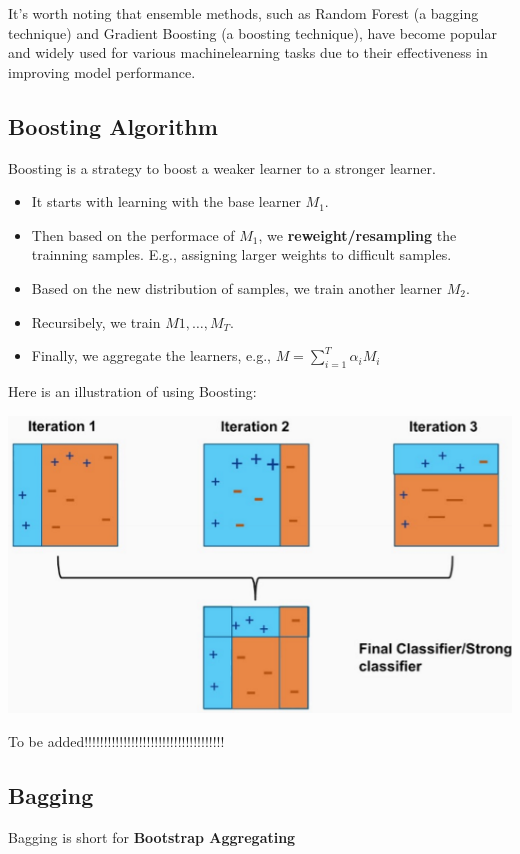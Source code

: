 \documentclass[letterpaper,12pt]{article}
\begin{document}
It's worth noting that ensemble methods, such as Random Forest (a bagging technique) and Gradient Boosting (a boosting technique), have become popular and widely used for various machine\-learning tasks due to their effectiveness in improving model performance.

\subsection{Boosting Algorithm}
Boosting is a strategy to boost a weaker learner to a stronger learner. 
\begin{itemize}
    \item It starts with learning with the base learner $M_1$. 
    \item Then based on the performace of $M_1$, we \textbf{reweight/resampling} the trainning samples. E.g., assigning larger weights to difficult samples. 
    \item Based on the new distribution of samples, we train another learner $M_2$. 
    \item Recursibely, we train $M1,\ldots,M_T$.
    \item Finally, we aggregate the learners, e.g., $M=\sum_{i=1}^{T} \alpha_i M_i$
\end{itemize}
Here is an illustration of using Boosting:

\includegraphics*{./Image/Boosting example.png}

To be added!!!!!!!!!!!!!!!!!!!!!!!!!!!!!!!!!!!!

\subsection{Bagging}
Bagging is short for \textbf{Bootstrap Aggregating}
\end{document}
